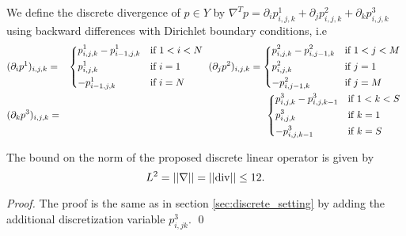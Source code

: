     \begin{definition} %
    \label{def:discrete_divergence_operator_ms}

        We define the discrete divergence of $p \in Y$ by $\nabla^{T} p = \partial_{i}p^{1}_{i, j, k} + \partial_{j}p^{2}_{i, j, k} + \partial_{k}p^{3}_{i, j, k}$ using backward differences with Dirichlet boundary conditions, i.e
            \begin{eqnarray}
                &(\partial_{i}p^{1})_{i, j, k} =&
                    \begin{dcases*}
                        p^{1}_{i, j, k} - p^{1}_{i-1, j, k} & \textnormal{if $1 < i < N$} \\
                        p^{1}_{i, j, k} & \textnormal{if $i = 1$} \\
                        -p^{1}_{i-1, j, k} & \textnormal{if $i = N$}
                    \end{dcases*}
                \notag
                (\partial_{j}p^{2})_{i, j, k} =
                    \begin{dcases*}
                        p^{2}_{i, j, k} - p^{2}_{i, j-1, k} & \textnormal{if $1 < j < M$} \\
                        p^{2}_{i, j, k} & \textnormal{if $j = 1$} \\
                        -p^{2}_{i, j-1, k} & \textnormal{if $j = M$}
                    \end{dcases*}
                \notag \\
                &(\partial_{k}p^{3})_{i, j, k} =&
                    \begin{dcases*}
                        p^{3}_{i, j, k} - p^{3}_{i, j, k-1} & \textnormal{if $1 < k < S$} \\
                        p^{3}_{i, j, k} & \textnormal{if $k = 1$} \\
                        -p^{3}_{i, j, k-1} & \textnormal{if $k = S$}
                    \end{dcases*}
                \notag
            \end{eqnarray}

    \end{definition}

    \begin{proposition} %
        \label{prop:bound_on_the_norm}

        The bound on the norm of the proposed discrete linear operator is given by
            \begin{equation}
                L^{2} = ||\nabla|| = ||\textnormal{div}|| \le 12.
            \end{equation}

    \end{proposition}

    \begin{proof}
    	The proof is the same as in section \ref{sec:discrete_setting} by adding the additional discretization variable $p^{3}_{i,jk}$.
    	\qed
    \end{proof}

